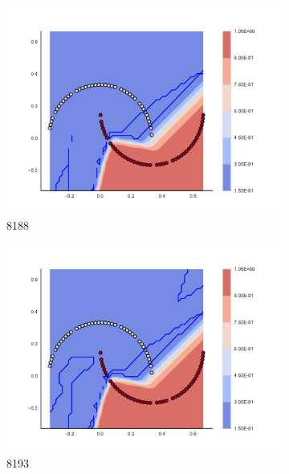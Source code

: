 \begin{figure}[h]
\begin{subfigure}[b]{0.09\textwidth}
    \includegraphics[clip, trim=2.35cm 1.75cm 4.5cm 0cm,width=\textwidth]{img/convergence/8188.pdf}
    \caption{8188}
    \label{fig:convergence_8188}
\end{subfigure}
%
\begin{subfigure}[b]{0.09\textwidth}
    \includegraphics[clip, trim=2.35cm 1.75cm 4.5cm 0cm,width=\textwidth]{img/convergence/8193.pdf}
    \caption{8193}
    \label{fig:convergence_8193}
\end{subfigure}
%
\begin{subfigure}[b]{0.09\textwidth}

\end{subfigure}
\end{figure}
